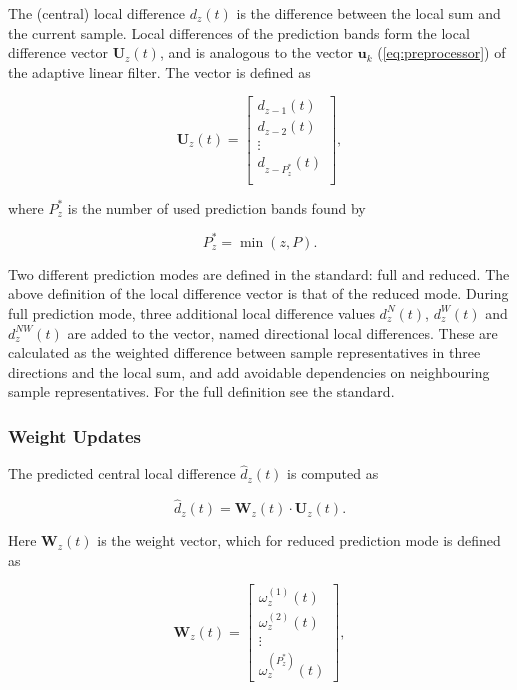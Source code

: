 The (central) local difference $d_z(t)$ is the difference between the local sum and the current sample. Local differences of the prediction bands form the local difference vector $\mathbf{U}_z(t)$, and is analogous to the vector $\mathbf{u}_k$ (\autoref{eq:preprocessor}) of the adaptive linear filter. The vector is defined as

\begin{equation}
	\mathbf{U}_z(t) =
	\begin{bmatrix}
		d_{z-1}(t)     \\
		d_{z-2}(t)     \\
		\vdots         \\
		d_{z-P^*_z}(t) \\
	\end{bmatrix},
	\label{eq:local-differences}
\end{equation}

where $P^*_z$ is the number of used prediction bands found by

\begin{equation}
	P^*_z = \min(z, P).
	\label{eq:prediction-bands}
\end{equation}

Two different prediction modes are defined in the standard: full and reduced. The above definition of the local difference vector is that of the reduced mode. During full prediction mode, three additional local difference values $d^N_z(t)$, $d^W_z(t)$ and $d^{NW}_z(t)$ are added to the vector, named directional local differences. These are calculated as the weighted difference between sample representatives in three directions and the local sum, and add avoidable dependencies on neighbouring sample representatives. For the full definition see the standard.

\subsubsection{Weight Updates}

The predicted central local difference $\hat{d}_z(t)$ is computed as

\begin{equation}
	\hat{d}_z(t) = \mathbf{W}_z(t) \cdot \mathbf{U}_z(t).
	\label{eq:predicted-central-local-difference}
\end{equation}

Here $\mathbf{W}_z(t)$ is the weight vector, which for reduced prediction mode is defined as

\begin{equation}
	\mathbf{W}_z(t)=
	\begin{bmatrix}
		\omega_z^{(1)}(t) \\
		\omega_z^{(2)}(t) \\
		\vdots            \\
		\omega_z^{(P^*_z)}(t)
	\end{bmatrix},
	\label{eq:weight-vector}
\end{equation}

